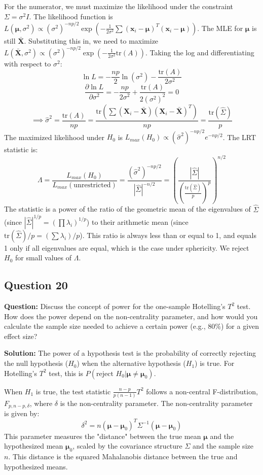 For the numerator, we must maximize the likelihood under the constraint $\Sigma = \sigma^2 I$.
The likelihood function is $L(\boldsymbol{\mu}, \sigma^2) \propto (\sigma^2)^{-np/2} \exp(-\frac{1}{2\sigma^2}\sum(\mathbf{x}_i-\boldsymbol{\mu})^T(\mathbf{x}_i-\boldsymbol{\mu}))$.
The MLE for $\boldsymbol{\mu}$ is still $\bar{\mathbf{X}}$. Substituting this in, we need to maximize $L(\bar{\mathbf{X}}, \sigma^2) \propto (\sigma^2)^{-np/2} \exp(-\frac{1}{2\sigma^2}\text{tr}(A))$.
Taking the log and differentiating with respect to $\sigma^2$:
$$ \ln L = -\frac{np}{2}\ln(\sigma^2) - \frac{\text{tr}(A)}{2\sigma^2} $$
$$ \frac{\partial \ln L}{\partial \sigma^2} = -\frac{np}{2\sigma^2} + \frac{\text{tr}(A)}{2(\sigma^2)^2} = 0 $$
$$ \implies \hat{\sigma}^2 = \frac{\text{tr}(A)}{np} = \frac{\text{tr}(\sum(\mathbf{X}_i-\bar{\mathbf{X}})(\mathbf{X}_i-\bar{\mathbf{X}})^T)}{np} = \frac{\text{tr}(\hat{\Sigma})}{p} $$
The maximized likelihood under $H_0$ is $L_{max}(H_0) \propto (\hat{\sigma}^2)^{-np/2} e^{-np/2}$.
The LRT statistic is:
$$ \Lambda = \frac{L_{max}(H_0)}{L_{max}(\text{unrestricted})} = \frac{(\hat{\sigma}^2)^{-np/2}}{|\hat{\Sigma}|^{-n/2}} = \left( \frac{|\hat{\Sigma}|}{(\frac{\text{tr}(\hat{\Sigma})}{p})^p} \right)^{n/2} $$
The statistic is a power of the ratio of the geometric mean of the eigenvalues of $\hat{\Sigma}$ (since $|\hat{\Sigma}|^{1/p} = (\prod \lambda_i)^{1/p}$) to their arithmetic mean (since $\text{tr}(\hat{\Sigma})/p = (\sum \lambda_i)/p$). This ratio is always less than or equal to 1, and equals 1 only if all eigenvalues are equal, which is the case under sphericity. We reject $H_0$ for small values of $\Lambda$.

\subsection*{Question 20}
\textbf{Question:} Discuss the concept of power for the one-sample Hotelling's $T^2$ test. How does the power depend on the non-centrality parameter, and how would you calculate the sample size needed to achieve a certain power (e.g., 80\%) for a given effect size?

\textbf{Solution:}
The power of a hypothesis test is the probability of correctly rejecting the null hypothesis ($H_0$) when the alternative hypothesis ($H_1$) is true. For Hotelling's $T^2$ test, this is $P(\text{reject } H_0 | \boldsymbol{\mu} \neq \boldsymbol{\mu}_0)$.

When $H_1$ is true, the test statistic $\frac{n-p}{p(n-1)} T^2$ follows a non-central F-distribution, $F_{p, n-p, \delta}$, where $\delta$ is the non-centrality parameter.
The non-centrality parameter is given by:
$$ \delta^2 = n(\boldsymbol{\mu} - \boldsymbol{\mu}_0)^T \Sigma^{-1} (\boldsymbol{\mu} - \boldsymbol{\mu}_0) $$
This parameter measures the "distance" between the true mean $\boldsymbol{\mu}$ and the hypothesized mean $\boldsymbol{\mu}_0$, scaled by the covariance structure $\Sigma$ and the sample size $n$. This distance is the squared Mahalanobis distance between the true and hypothesized means.

